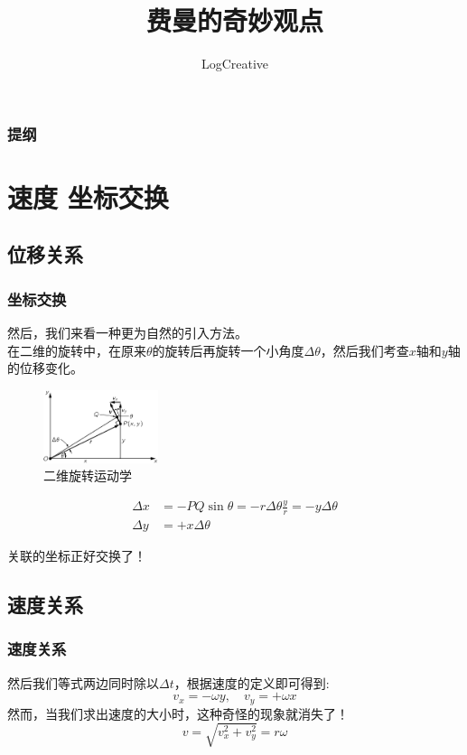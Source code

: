 \documentclass[unicode]{beamer}
\begin{document}
\begin{CJK}{UTF8}{gbsn}
    
    \title{费曼的奇妙观点}
    \author{LogCreative}    %

    \begin{frame}
    \titlepage
    \end{frame}

    \begin{frame}
    \frametitle{提纲}
    \tableofcontents
    \end{frame}

\section{速度 坐标交换}
\subsection[位移关系]{位移关系}
    \begin{frame}
        \frametitle{坐标交换}
        然后，我们来看一种更为自然的引入方法。\\
        在二维的旋转中，在原来$\theta$的旋转后再旋转一个小角度$\Delta\theta$，然后我们考查$x$轴和$y$轴的位移变化。
    \begin{figure}
    \centering
    \includegraphics[width=0.3\textwidth]{pic1.png}
    \caption{二维旋转运动学}
    \end{figure}
    \begin{align}
    \Delta x&=-PQ \sin\theta=-r\Delta\theta \frac{y}{r}=-y\Delta\theta \\
    \Delta y&=+x\Delta\theta
    \end{align}

    关联的坐标正好交换了！
    \end{frame}

\subsection{速度关系}
    \begin{frame}
    \frametitle{速度关系}
    然后我们等式两边同时除以$\Delta t$，根据速度的定义即可得到:
    \begin{equation}
        v_x=-\omega y,\quad  v_y=+\omega x
    \end{equation}
    然而，当我们求出速度的大小时，这种奇怪的现象就消失了！
    \begin{equation}
    v=\sqrt{v_x^2+v_y^2}=r\omega
    \end{equation}
    \end{frame}


\end{CJK}
\end{document}
